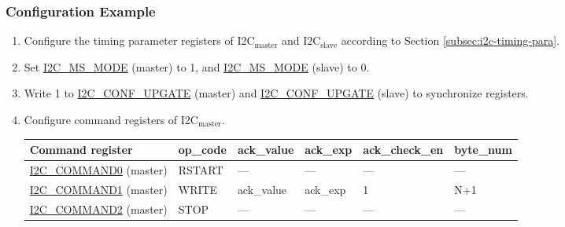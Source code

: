 \documentclass[main\_\_EN.tex]{subfiles}
\begin{document}
\subsubsection{Configuration Example}
\begin{enumerate}
\item Configure the timing parameter registers of I2C$_\text{master}$ and I2C$_\text{slave}$ according to Section \ref{subsec:i2c-timing-para}.
\item Set \hyperref[fielddesc:I2CMSMODE]{I2C\_MS\_MODE} (master) to 1, and \hyperref[fielddesc:I2CMSMODE]{I2C\_MS\_MODE} (slave) to 0.
\item Write 1 to \hyperref[fielddesc:I2CCONFUPGATE]{I2C\_CONF\_UPGATE} (master) and \hyperref[fielddesc:I2CCONFUPGATE]{I2C\_CONF\_UPGATE} (slave) to synchronize registers.
\item Configure command registers of I2C$_\text{master}$.

\begin{longtable}{ | p{4cm} | p{2cm} | p{2cm} | p{2cm} |p{2cm} | p{2cm} |}
\hline\rowcolor{lightgray}
Command register& op\_code & ack\_value&ack\_exp&ack\_check\_en&byte\_num  \\ \hline
\hyperref[fielddesc:I2CCOMMAND0]{I2C\_COMMAND0} (master)& RSTART& ---&---&---&---  \\ \hline
\hyperref[fielddesc:I2CCOMMAND1]{I2C\_COMMAND1} (master)& WRITE& ack\_value&ack\_exp&1&N+1  \\ \hline
\hyperref[fielddesc:I2CCOMMAND2]{I2C\_COMMAND2} (master)& STOP& ---&---&---&---  \\ \hline
\end{longtable}


\end{enumerate}
\end{document}
